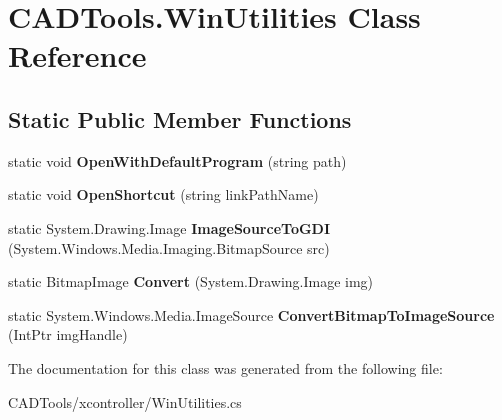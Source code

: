 \hypertarget{class_c_a_d_tools_1_1_win_utilities}{}\section{C\+A\+D\+Tools.\+Win\+Utilities Class Reference}
\label{class_c_a_d_tools_1_1_win_utilities}
\subsection*{Static Public Member Functions}
\begin{DoxyCompactItemize}
\item 
\mbox{\label{class_c_a_d_tools_1_1_win_utilities_a1c4dee71704b9c8d91dce06da66c8dfa}} 
static void {\bfseries Open\+With\+Default\+Program} (string path)
\item 
\mbox{\label{class_c_a_d_tools_1_1_win_utilities_a035aeba61cb4218e911e8d9ea7649868}} 
static void {\bfseries Open\+Shortcut} (string link\+Path\+Name)
\item 
\mbox{\label{class_c_a_d_tools_1_1_win_utilities_a11e38744132fafc5df6e46d5bcb2d6f9}} 
static System.\+Drawing.\+Image {\bfseries Image\+Source\+To\+G\+DI} (System.\+Windows.\+Media.\+Imaging.\+Bitmap\+Source src)
\item 
\mbox{\label{class_c_a_d_tools_1_1_win_utilities_abcfefc99a601e3c6694c79f0bb0a9191}} 
static Bitmap\+Image {\bfseries Convert} (System.\+Drawing.\+Image img)
\item 
\mbox{\label{class_c_a_d_tools_1_1_win_utilities_a8da0e9bcded19cca09e48a6600b0248d}} 
static System.\+Windows.\+Media.\+Image\+Source {\bfseries Convert\+Bitmap\+To\+Image\+Source} (Int\+Ptr img\+Handle)
\end{DoxyCompactItemize}


The documentation for this class was generated from the following file\+:\begin{DoxyCompactItemize}
\item 
C\+A\+D\+Tools/xcontroller/Win\+Utilities.\+cs\end{DoxyCompactItemize}
